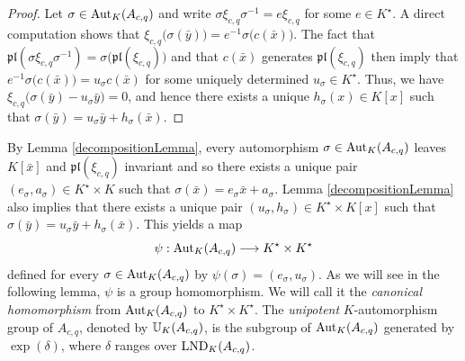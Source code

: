 \documentclass{article}
\newcommand \pl {\mathfrak{pl}}
\renewcommand \a {A}
\renewcommand \k {K}
\newcommand \saut {{\rm \mathbb{U}}}
\newcommand \auto {{\rm Aut}}
\newcommand \lnd {{\rm LND}}
\begin{document}
{\begin{proof}
	 Let $\sigma\in\auto_{\k}(\a_{c,q})$ and write $\sigma\xi_{c,q}\sigma^{-1}=e\xi_{c,q}$ for some $e\in\k^{\star}$. A direct computation shows that $\xi_{c,q}\big(\sigma(\bar{y})\big)=e^{-1}\sigma\big(c(\bar{x})\big)$. The fact that $\pl(\sigma\xi_{c,q}\sigma^{-1})=\sigma\big(\pl(\xi_{c,q})\big)$ and that $c(\bar{x})$ generates $\pl(\xi_{c,q})$ then imply that $e^{-1}\sigma\big(c(\bar{x})\big)=u_{\sigma}c(\bar{x})$ for some uniquely determined $u_{\sigma}\in\k^{\star}$. Thus, we have $\xi_{c,q}\big(\sigma(\bar{y})-u_{\sigma}\bar{y}\big)=0$, and hence there exists a unique $h_{\sigma}(x)\in\k[x]$ such that $\sigma(\bar{y})=u_{\sigma}\bar{y}+h_{\sigma}(\bar{x})$.
\end{proof}

\smallskip By Lemma \ref{decompositionLemma}, every automorphism $\sigma\in\auto_{\k}(\a_{c,q})$ leaves $\k[\bar{x}]$ and $\pl(\xi_{c,q})$ invariant and so there exists a unique pair $(e_{\sigma},a_{\sigma})\in\k^{\star}\times\k$ such that $\sigma(\bar{x})=e_{\sigma}\bar{x}+a_{\sigma}$. Lemma \ref{decompositionLemma} also implies that there exists a unique pair $(u_{\sigma},h_{\sigma})\in\k^{\star}\times\k[x]$ such that $\sigma(\bar{y})=u_{\sigma}\bar{y}+h_{\sigma}(\bar{x})$. This yields a map $$\psi:\auto_{\k}(\a_{c,q})\longrightarrow \k^{\star}\times\k^{\star}$$ defined for every $\sigma\in\auto_{\k}(\a_{c,q})$ by $\psi(\sigma)=(e_{\sigma},u_{\sigma})$. As we will see in the following lemma, $\psi$ is a group homomorphism. We will call it the {\it canonical homomorphism} from $\auto_{\k}(\a_{c,q})$ to $\k^{\star}\times\k^{\star}$. The {\it unipotent} $\k$-automorphism group of $\a_{c,q}$, denoted by $\saut_{\k}(\a_{c,q})$, is the subgroup of $\auto_{\k}(\a_{c,q})$ generated by $\exp(\delta)$, where $\delta$ ranges over $\lnd_{\k}(\a_{c,q})$.


}
\end{document}
